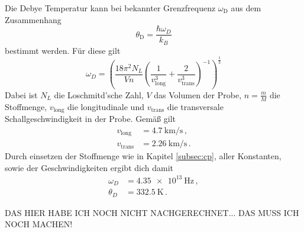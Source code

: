 Die Debye Temperatur kann bei bekannter Grenzfrequenz $\omega_\text{D}$ aus dem Zusammenhang
\begin{equation*}
  \theta_\text{D}=\frac{\hbar \omega_D}{k_B}
\end{equation*}
bestimmt werden. Für diese gilt
\begin{equation*}
  \omega_D=\left(\frac{18 \pi^2 N_L}{V n}\left(\frac{1}{v_{\text{long}}^3}+
  \frac{2}{v_{\text{trans}}^3} \right)^{-1} \right)^{\frac{1}{3}}
\end{equation*}
Dabei ist $N_L$ die Loschmitd'sche Zahl, $V$ das Volumen der Probe, $n=\frac{m}{M}$ die Stoffmenge,
$v_{\text{long}}$ die longitudinale und $v_{\text{trans}}$ die transversale Schallgeschwindigkeit
in der Probe. Gemäß \cite{versuchsanleitung} gilt
\begin{align*}
  v_{\text{long}}&= \SI{4.7}{\kilo\metre\per\second} \,,\\
  v_{\text{trans}}&=\SI{2.26}{\kilo\metre\per\second} \,.
\end{align*}
Durch einsetzen der Stoffmenge wie in Kapitel \ref{subsec:cp}, aller Konstanten,
sowie der Geschwindigkeiten ergibt dich damit
\begin{align*}
  \omega_D&=\SI{4.35e13}{\hertz} \,, \\
  \theta_D&=\SI{332.5}{\kelvin} \,.
\end{align*}

DAS HIER HABE ICH NOCH NICHT NACHGERECHNET... DAS MUSS ICH NOCH MACHEN!
